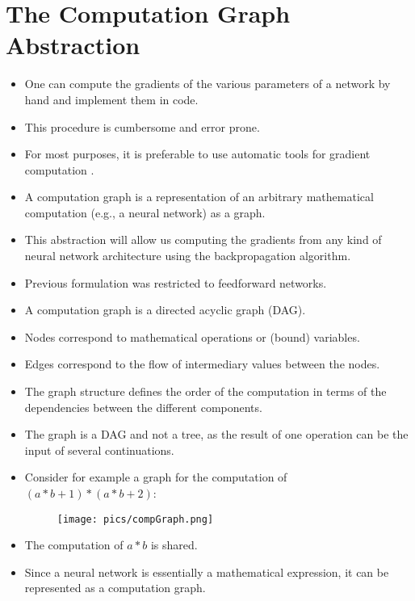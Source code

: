 \section{The Computation Graph Abstraction}
\begin{itemize}
\item  One can compute the gradients of the various parameters of a network by hand and implement them in code.

\item This procedure is cumbersome and error prone.

\item For most purposes, it is preferable to use automatic tools for gradient computation \cite{bengio2012practical}.

\item A computation graph is a representation of an arbitrary mathematical computation (e.g., a neural network) as a graph.

\item This abstraction will allow us computing the gradients from any kind of neural network architecture using the backpropagation algorithm. 

\item Previous formulation was restricted to feedforward networks.

\item A computation graph is a directed acyclic graph (DAG).

\item Nodes correspond to mathematical operations or (bound) variables.

\item Edges correspond to the flow of intermediary values between the nodes.

\item The graph structure defines the order of the computation in terms of the dependencies  between the different components.

\item The graph is a DAG and not a tree, as the result of one operation can be the input of several continuations.

\item Consider for example a graph for the computation of $(a*b+1)*(a*b+2)$:

\begin{figure}[htb]
	\centering
	 \texttt{[image: pics/compGraph.png]}
\end{figure}

\item The computation of $a*b$ is shared.

\item Since a neural network is essentially a mathematical expression, it can be represented as a computation graph.

\end{itemize}



